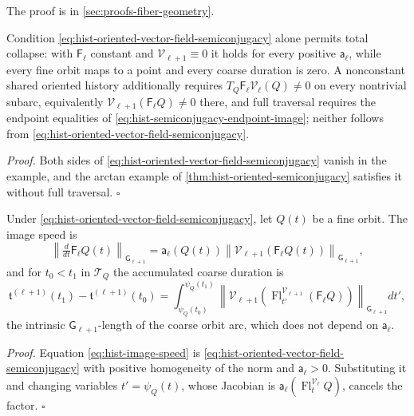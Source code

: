 The proof is in \cref{sec:proofs-fiber-geometry}.

Condition \eqref{eq:hist-oriented-vector-field-semiconjugacy} alone permits total
collapse: with $\mathsf F_\ell$ constant and $\mathscr V_{\ell+1}\equiv0$ it holds for
every positive $\mathsf a_\ell$, while every fine orbit maps to a point and every coarse
duration is zero.  A nonconstant shared oriented history additionally requires
$T_Q\mathsf F_\ell\mathscr V_\ell(Q)\ne0$ on every nontrivial subarc, equivalently
$\mathscr V_{\ell+1}(\mathsf F_\ell Q)\ne0$ there, and full traversal requires the
endpoint equalities of \eqref{eq:hist-semiconjugacy-endpoint-image}; neither follows from
\eqref{eq:hist-oriented-vector-field-semiconjugacy}.  

\noindent\emph{Proof.}
Both sides of \eqref{eq:hist-oriented-vector-field-semiconjugacy} vanish in the example,
and the arctan example of \cref{thm:hist-oriented-semiconjugacy} satisfies it without
full traversal.  $\square$

Under \eqref{eq:hist-oriented-vector-field-semiconjugacy}, let $Q(t)$ be a fine orbit.
The image speed is
\begin{equation}
\left\lVert\tfrac{d}{dt}\mathsf F_\ell Q(t)\right\rVert_{\mathsf G_{\ell+1}}
=\mathsf a_\ell\left(Q(t)\right)
\left\lVert\mathscr V_{\ell+1}\left(\mathsf F_\ell Q(t)\right)\right\rVert_{\mathsf G_{\ell+1}},
\label{eq:hist-image-speed}
\end{equation}
and for $t_0<t_1$ in $\mathcal T_Q$ the accumulated coarse duration is
\begin{equation}
\mathfrak t^{(\ell+1)}(t_1)-\mathfrak t^{(\ell+1)}(t_0)
=\int_{\psi_Q(t_0)}^{\psi_Q(t_1)}
\left\lVert\mathscr V_{\ell+1}\left(\operatorname{Fl}^{\mathscr V_{\ell+1}}_{t'}(\mathsf F_\ell Q)\right)
\right\rVert_{\mathsf G_{\ell+1}}dt',
\label{eq:hist-coarse-duration}
\end{equation}
the intrinsic $\mathsf G_{\ell+1}$-length of the coarse orbit arc, which does not depend
on $\mathsf a_\ell$.  

\noindent\emph{Proof.}
Equation \eqref{eq:hist-image-speed} is \eqref{eq:hist-oriented-vector-field-semiconjugacy}
with positive homogeneity of the norm and $\mathsf a_\ell>0$.  Substituting it and
changing variables $t'=\psi_Q(t)$, whose Jacobian is
$\mathsf a_\ell(\operatorname{Fl}^{\mathscr V_\ell}_tQ)$, cancels the factor.  $\square$

